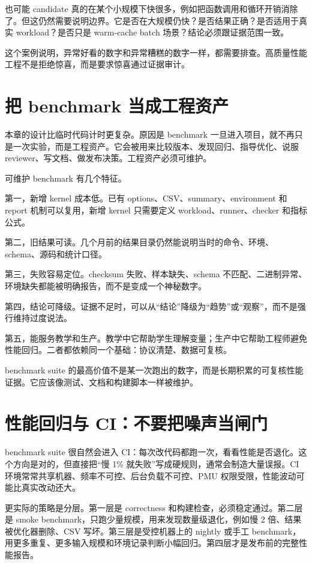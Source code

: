 也可能 candidate 真的在某个小规模下快很多，例如把函数调用和循环开销消除了。但这仍然需要说明边界。它是否在大规模仍快？是否结果正确？是否适用于真实 workload？是否只是 warm-cache batch 场景？结论必须跟证据范围一致。

这个案例说明，异常好看的数字和异常糟糕的数字一样，都需要排查。高质量性能工程不是拒绝惊喜，而是要求惊喜通过证据审计。

\section{把 benchmark 当成工程资产}

本章的设计比临时代码计时更复杂。原因是 benchmark 一旦进入项目，就不再只是一次实验，而是工程资产。它会被用来比较版本、发现回归、指导优化、说服 reviewer、写文档、做发布决策。工程资产必须可维护。

可维护 benchmark 有几个特征。

第一，新增 kernel 成本低。已有 options、CSV、summary、environment 和 report 机制可以复用，新增 kernel 只需要定义 workload、runner、checker 和指标公式。

第二，旧结果可读。几个月前的结果目录仍然能说明当时的命令、环境、schema、源码和统计口径。

第三，失败容易定位。checksum 失败、样本缺失、schema 不匹配、二进制异常、环境缺失都能被明确报告，而不是变成一个神秘数字。

第四，结论可降级。证据不足时，可以从“结论”降级为“趋势”或“观察”，而不是强行维持过度说法。

第五，能服务教学和生产。教学中它帮助学生理解变量；生产中它帮助工程师避免性能回归。二者都依赖同一个基础：协议清楚、数据可复核。

\begin{keyidea}
benchmark suite 的最高价值不是某一次跑出的数字，而是长期积累的可复核性能证据。它应该像测试、文档和构建脚本一样被维护。
\end{keyidea}

\section{性能回归与 CI：不要把噪声当闸门}

benchmark suite 很自然会进入 CI：每次改代码都跑一次，看看性能是否退化。这个方向是对的，但直接把“慢 1\% 就失败”写成硬规则，通常会制造大量误报。CI 环境常常共享机器、频率不可控、后台负载不可控、PMU 权限受限，性能波动可能比真实改动还大。

更实际的策略是分层。第一层是 correctness 和构建检查，必须稳定通过。第二层是 smoke benchmark，只跑少量规模，用来发现数量级退化，例如慢 2 倍、结果被优化器删除、CSV 写坏。第三层是受控机器上的 nightly 或手工 benchmark，用更多重复、更多输入规模和环境记录判断小幅回归。第四层才是发布前的完整性能报告。

